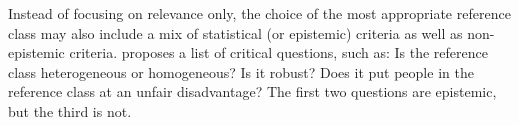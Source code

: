 \documentclass{article}
\begin{document}
Instead of focusing on relevance only, the choice of the most appropriate reference class may also include a mix of statistical (or epistemic) criteria as well as non-epistemic criteria. \citet{dahlman2017unacceptable} proposes a list of critical questions, such as:
Is the reference class heterogeneous or homogeneous? Is it robust? Does it put people in the reference class at an unfair disadvantage?
The first two questions are epistemic, but the third is not. %
\end{document}
